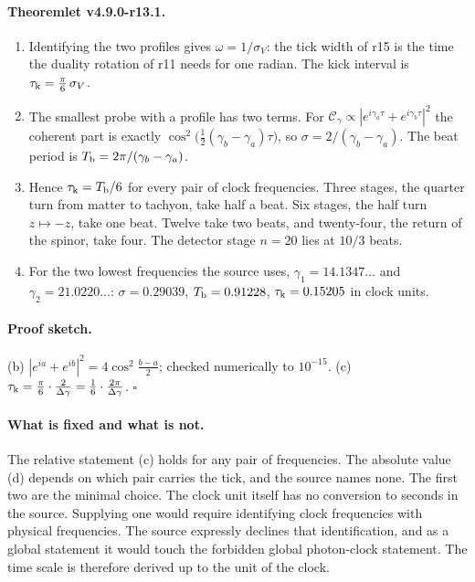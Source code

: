 \paragraph{Theoremlet v4.9.0-r13.1.}
\begin{enumerate}[leftmargin=2em]
\item[(a)] Identifying the two profiles gives \(\omega=1/\sigma_V\): the tick width of r15 is the time the duality rotation of r11
needs for one radian.  The kick interval is \(\tau_{\rm k}=\tfrac\pi6\,\sigma_V\).
\item[(b)] The smallest probe with a profile has two terms.  For
\(\mathcal C_\gamma\propto|e^{i\gamma_a\tau}+e^{i\gamma_b\tau}|^2\) the coherent part is exactly
\(\cos^2\bigl(\tfrac12(\gamma_b-\gamma_a)\tau\bigr)\), so \(\sigma=2/(\gamma_b-\gamma_a)\).  The beat period is
\(T_{\rm b}=2\pi/(\gamma_b-\gamma_a)\).
\item[(c)] Hence \(\tau_{\rm k}=T_{\rm b}/6\) for every pair of clock frequencies.  Three stages, the quarter turn from matter to
tachyon, take half a beat.  Six stages, the half turn \(z\mapsto-z\), take one beat.  Twelve take two beats, and twenty-four,
the return of the spinor, take four.  The detector stage \(n=20\) lies at \(10/3\) beats.
\item[(d)] For the two lowest frequencies the source uses, \(\gamma_1=14.1347\ldots\) and \(\gamma_2=21.0220\ldots\):
\(\sigma=0.29039\), \(T_{\rm b}=0.91228\), \(\tau_{\rm k}=0.15205\) in clock units.
\end{enumerate}

\paragraph{Proof sketch.}
(b) \(|e^{ia}+e^{ib}|^2=4\cos^2\tfrac{b-a}2\); checked numerically to \(10^{-15}\).  (c) \(\tau_{\rm k}=\tfrac\pi6\cdot\tfrac2{\Delta\gamma}=
\tfrac16\cdot\tfrac{2\pi}{\Delta\gamma}\).  \(\square\)

\paragraph{What is fixed and what is not.}
The relative statement (c) holds for any pair of frequencies.  The absolute value (d) depends on which pair carries the
tick, and the source names none.  The first two are the minimal choice.  The clock unit itself has no conversion to
seconds in the source.  Supplying one would require identifying clock frequencies with physical frequencies.  The source
expressly declines that identification, and as a global statement it would touch the forbidden global photon-clock
statement.  The time scale is therefore derived up to the unit of the clock.

